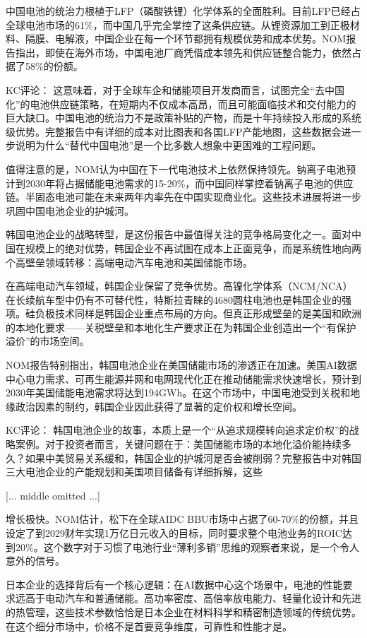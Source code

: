 \documentclass[11pt]{ctexart}
\begin{document}
中国电池的统治力根植于LFP（磷酸铁锂）化学体系的全面胜利。目前LFP已经占全球电池市场的61\%，而中国几乎完全掌控了这条供应链。从锂资源加工到正极材料、隔膜、电解液，中国企业在每一个环节都拥有规模优势和成本优势。NOM报告指出，即使在海外市场，中国电池厂商凭借成本领先和供应链整合能力，依然占据了58\%的份额。

KC评论： 这意味着，对于全球车企和储能项目开发商而言，试图完全“去中国化”的电池供应链策略，在短期内不仅成本高昂，而且可能面临技术和交付能力的巨大缺口。中国电池的统治力不是政策补贴的产物，而是十年持续投入形成的系统级优势。完整报告中有详细的成本对比图表和各国LFP产能地图，这些数据会进一步说明为什么“替代中国电池”是一个比多数人想象中更困难的工程问题。

值得注意的是，NOM认为中国在下一代电池技术上依然保持领先。钠离子电池预计到2030年将占据储能电池需求的15-20\%，而中国同样掌控着钠离子电池的供应链。半固态电池可能在未来两年内率先在中国实现商业化。这些技术进展将进一步巩固中国电池企业的护城河。

韩国电池企业的战略转型，是这份报告中最值得关注的竞争格局变化之一。面对中国在规模上的绝对优势，韩国企业不再试图在成本上正面竞争，而是系统性地向两个高壁垒领域转移：高端电动汽车电池和美国储能市场。

在高端电动汽车领域，韩国企业保留了竞争优势。高镍化学体系（NCM/NCA）在长续航车型中仍有不可替代性，特斯拉青睐的4680圆柱电池也是韩国企业的强项。硅负极技术同样是韩国企业重点布局的方向。但真正形成壁垒的是美国和欧洲的本地化要求——关税壁垒和本地化生产要求正在为韩国企业创造出一个“有保护溢价”的市场空间。

NOM报告特别指出，韩国电池企业在美国储能市场的渗透正在加速。美国AI数据中心电力需求、可再生能源并网和电网现代化正在推动储能需求快速增长，预计到2030年美国储能电池需求将达到194GWh。在这个市场中，中国电池受到关税和地缘政治因素的制约，韩国企业因此获得了显著的定价权和增长空间。

KC评论： 韩国电池企业的故事，本质上是一个“从追求规模转向追求定价权”的战略案例。对于投资者而言，关键问题在于：美国储能市场的本地化溢价能持续多久？如果中美贸易关系缓和，韩国企业的护城河是否会被削弱？完整报告中对韩国三大电池企业的产能规划和美国项目储备有详细拆解，这些

[... middle omitted ...]

增长极快。NOM估计，松下在全球AIDC BBU市场中占据了60-70\%的份额，并且设定了到2029财年实现1万亿日元收入的目标，同时要求整个电池业务的ROIC达到20\%。这个数字对于习惯了电池行业“薄利多销”思维的观察者来说，是一个令人意外的信号。

日本企业的选择背后有一个核心逻辑：在AI数据中心这个场景中，电池的性能要求远高于电动汽车和普通储能。高功率密度、高倍率放电能力、轻量化设计和先进的热管理，这些技术参数恰恰是日本企业在材料科学和精密制造领域的传统优势。在这个细分市场中，价格不是首要竞争维度，可靠性和性能才是。
\end{document}
